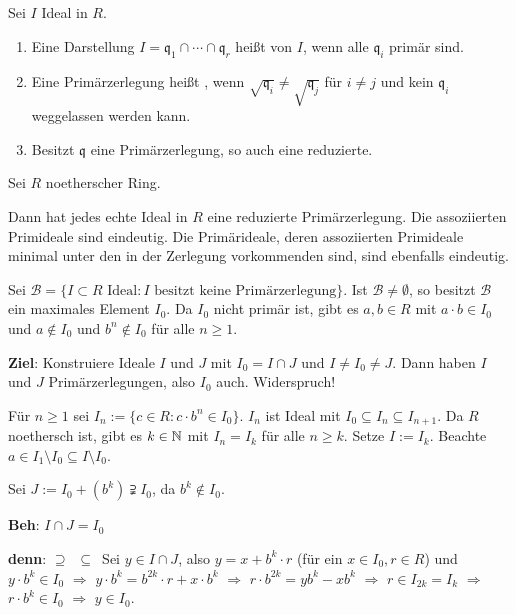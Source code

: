\documentclass[a4paper, 10pt]{report}
\begin{document}
\begin{Def}
Sei $I$ Ideal in $R$.

\begin{enumerate}
\item Eine Darstellung $I = \mathfrak{q}_1 \cap \cdots \cap \mathfrak{q}_r$ heißt  von $I$, wenn alle $\mathfrak{q}_i$ primär sind.

\item Eine Primärzerlegung heißt , wenn $\sqrt{\mathfrak{q}_i} \neq \sqrt{\mathfrak{q}_j}$ für $i \neq j$ und kein $\mathfrak{q}_i$ weggelassen werden kann.

\item Besitzt $\mathfrak{q}$ eine Primärzerlegung, so auch eine reduzierte.
\end{enumerate}
\end{Def}

\begin{Satz}
Sei $R$ noetherscher Ring.

Dann hat jedes echte Ideal in $R$ eine reduzierte Primärzerlegung. Die assoziierten Primideale sind eindeutig. Die Primärideale, deren assoziierten Primideale minimal unter den in der Zerlegung vorkommenden sind, sind ebenfalls eindeutig.

\begin{Bew}
Sei $\mathcal{B} = \{ I \subset R \text{ Ideal} : I \text{ besitzt keine Primärzerlegung} \}$. Ist $\mathcal{B} \neq \emptyset$, so besitzt $\mathcal{B}$ ein maximales Element $I_0$. Da $I_0$ nicht primär ist, gibt es $a,b \in R$ mit $a \cdot b \in I_0$ und $a \notin I_0$ und $b^n \notin I_0$ für alle $n \geq 1$.

\textbf{Ziel}: Konstruiere Ideale $I$ und $J$ mit $I_0 = I \cap J$ und $I \neq I_0 \neq J$. Dann haben $I$ und $J$ Primärzerlegungen, also $I_0$ auch. Widerspruch!

Für $n \geq 1$ sei $I_n := \{ c \in R : c \cdot b^n \in I_0 \}$. $I_n$ ist Ideal mit $I_0 \subseteq I_n \subseteq I_{n+1}$. Da $R$ noethersch ist, gibt es $k \in \mathbb{N}$ mit $I_n = I_k$ für alle $n \geq k$. Setze $I := I_k$. Beachte $a \in I_1 \setminus I_0 \subseteq I \setminus I_0$.

Sei $J := I_0 + (b^k) \supsetneqq I_0$, da $b^k \notin I_0$.

\textbf{Beh}: $I \cap J = I_0$

\textbf{denn}: \glqq$\supseteq$\grqq\ \chk \glqq$\subseteq$\grqq\ Sei $y \in I
\cap J$,
also $y = x + b^k \cdot r$ (für ein $x \in I_0, r \in R$) und $y \cdot b^k \in I_0$ $\Rightarrow$ $y \cdot b^k = b^{2k} \cdot r + x \cdot b^k$ $\Rightarrow$ $r \cdot b^{2k} = y b^k-x b^k$ $\Rightarrow$ $r \in I_{2k} = I_k$ $\Rightarrow$ $r \cdot b^k \in I_0$ $\Rightarrow$ $y \in I_0$.

\end{Bew}
\end{Satz}

\appendix
\renewcommand{\indexname}{Stichwortverzeichnis}
\printindex
\end{document}
